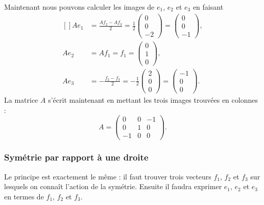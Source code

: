 Maintenant nous pouvons calculer les images de $e_1$, $e_2$ et $e_3$ en faisant
\begin{equation}
	\begin{aligned}[]
		Ae_1&=\frac{ Af_2-Af_3 }{ 2 }=\frac{1 }{2}\begin{pmatrix}
			0	\\
			0	\\
			-2
		\end{pmatrix}=\begin{pmatrix}
			0	\\
			0	\\
			-1
		\end{pmatrix},\\
		Ae_2&=Af_1=f_1=\begin{pmatrix}
			0	\\
			1	\\
			0
		\end{pmatrix},\\
		Ae_3&=-\frac{ f_2-f_3 }{ 2 }=-\frac{ 1 }{2}\begin{pmatrix}
			2	\\
			0	\\
			0
		\end{pmatrix}=\begin{pmatrix}
			-1	\\
			0	\\
			0
		\end{pmatrix}.
	\end{aligned}
\end{equation}
La matrice $A$ s'écrit maintenant en mettant les trois images trouvées en colonnes :
\begin{equation}
	A=\begin{pmatrix}
		0	&	0	&	-1	\\
		0	&	1	&	0	\\
		-1	&	0	&	0
	\end{pmatrix}.
\end{equation}

\subsubsection{Symétrie par rapport à une droite}

Le principe est exactement le même : il faut trouver trois vecteurs $f_1$, $f_2$ et $f_3$ sur lesquels on connaît l'action de la symétrie. Ensuite il faudra exprimer $e_1$, $e_2$ et $e_3$ en termes de $f_1$, $f_2$ et $f_3$.


